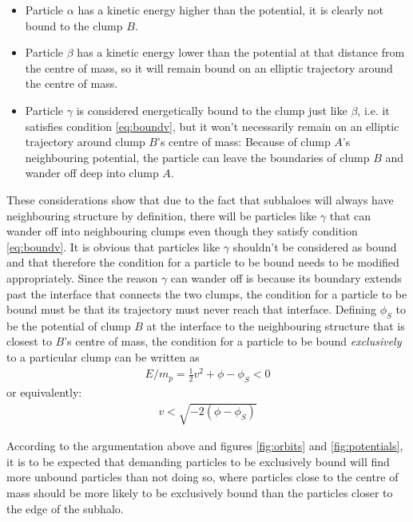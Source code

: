 \begin{itemize}
	\item Particle $\alpha$ has a kinetic energy higher than the potential, it is clearly not bound to the clump $B$.
	\item Particle $\beta$ has a kinetic energy lower than the potential at that distance from the centre of mass, so it will remain bound on an elliptic trajectory around the centre of mass.
	\item Particle $\gamma$ is considered energetically bound to the clump just like $\beta$, i.e. it satisfies condition \eqref{eq:boundv}, but it won't necessarily remain on an elliptic trajectory around clump $B$'s centre of mass: Because of clump $A$'s neighbouring potential, the particle can leave the boundaries of clump $B$ and wander off deep into clump $A$.
\end{itemize}
%

These considerations show that due to the fact that subhaloes will always have neighbouring structure by definition, there will be particles like $\gamma$ that can wander off into neighbouring clumps even though they satisfy condition \eqref{eq:boundv}.
It is obvious that particles like $\gamma$ shouldn't be considered as bound and that therefore the condition for a particle to be bound needs to be modified appropriately.
Since the reason $\gamma$ can wander off is because its boundary extends past the interface that connects the two clumps, the condition for a particle to be bound must be that its trajectory must never reach that interface.
Defining $\phi_S$ to be the potential of clump $B$ at the interface to the neighbouring structure that is closest to $B$'s centre of mass, the condition for a particle to be bound \emph{exclusively} to a particular clump can be written as
%
\begin{align}
	E/m_p = \frac{1}{2}v^2 + \phi -  \phi_S < 0
\end{align}
%
or equivalently:
%
\begin{align}
	v < \sqrt{ - 2(\phi - \phi_S) } \label{eq:boundv_corr}
\end{align}


According to the argumentation above and figures \ref{fig:orbits} and \ref{fig:potentials}, it is to be expected that demanding particles to be exclusively bound will find more unbound particles than not doing so, where particles close to the centre of mass should be more likely to be exclusively bound than the particles closer to the edge of the subhalo.




